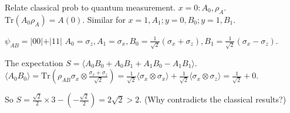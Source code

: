 \documentclass{article}
\newcommand{\Tr}{\mathrm{Tr}}
\newcommand{\ket}[1]{\vert #1\vert}
\begin{document}
\begin{spacing}{1.2}
Relate classical prob to quantum measurement. $x=0: A_0, \rho_A$. $\Tr(A_0 \rho_A) = A(0)$. Similar for $x=1, A_1; y=0, B_0; y=1, B_1$.

$\psi_{AB} = \ket{00}+\ket{11}$
$A_0 = \sigma_z, A_1 = \sigma_x, B_0 = \frac1{\sqrt2} (\sigma_x+\sigma_z), B_1 = \frac1{\sqrt2} (\sigma_x-\sigma_z)$.

The expectation $S = \langle A_0B_0 +A_0B_1+A_1B_0-A_1B_1\rangle$.
$\langle A_0 B_0\rangle = \Tr(\rho_{AB}\sigma_x\otimes \frac{\sigma_x+\sigma_z}{\sqrt{2}}) = \frac{1}{\sqrt2}\langle \sigma_x\otimes\sigma_x\rangle+\frac{1}{\sqrt2}\langle \sigma_x\otimes\sigma_z \rangle = \frac{1}{\sqrt2}+0$.

So $S = \frac{\sqrt2}{2}\times 3-(-\frac{\sqrt2}{2}) = 2\sqrt{2}>2$. (Why contradicts the classical results?)
\end{spacing}
\end{document}
